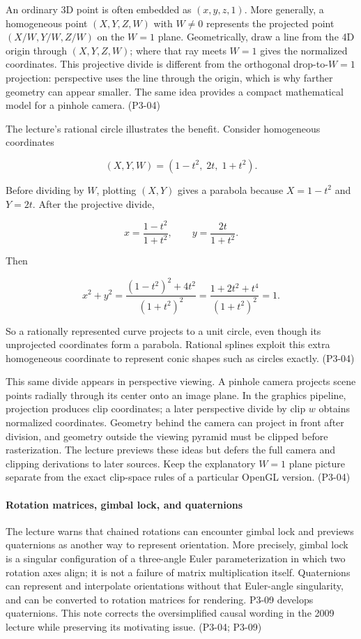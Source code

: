 An ordinary 3D point is often embedded as \((x,y,z,1)\). More generally, a homogeneous point \((X,Y,Z,W)\) with \(W\ne0\) represents the projected point \((X/W,Y/W,Z/W)\) on the \(W=1\) plane. Geometrically, draw a line from the 4D origin through \((X,Y,Z,W)\); where that ray meets \(W=1\) gives the normalized coordinates. This projective divide is different from the orthogonal drop-to-\(W=1\) projection: perspective uses the line through the origin, which is why farther geometry can appear smaller. The same idea provides a compact mathematical model for a pinhole camera. (P3-04)

The lecture's rational circle illustrates the benefit. Consider homogeneous coordinates

\[
(X,Y,W)=(1-t^2,\;2t,\;1+t^2).
\]

Before dividing by \(W\), plotting \((X,Y)\) gives a parabola because \(X=1-t^2\) and \(Y=2t\). After the projective divide,

\[
x=\frac{1-t^2}{1+t^2},\qquad y=\frac{2t}{1+t^2}.
\]

Then

\[
x^2+y^2=\frac{(1-t^2)^2+4t^2}{(1+t^2)^2}
=\frac{1+2t^2+t^4}{(1+t^2)^2}=1.
\]

So a rationally represented curve projects to a unit circle, even though its unprojected coordinates form a parabola. Rational splines exploit this extra homogeneous coordinate to represent conic shapes such as circles exactly. (P3-04)

This same divide appears in perspective viewing. A pinhole camera projects scene points radially through its center onto an image plane. In the graphics pipeline, projection produces clip coordinates; a later perspective divide by clip \(w\) obtains normalized coordinates. Geometry behind the camera can project in front after division, and geometry outside the viewing pyramid must be clipped before rasterization. The lecture previews these ideas but defers the full camera and clipping derivations to later sources. Keep the explanatory \(W=1\) plane picture separate from the exact clip-space rules of a particular OpenGL version. (P3-04)

\paragraph{Rotation matrices, gimbal lock, and quaternions}\label{rotation-matrices-gimbal-lock-and-quaternions}

The lecture warns that chained rotations can encounter gimbal lock and previews quaternions as another way to represent orientation. More precisely, gimbal lock is a singular configuration of a three-angle Euler parameterization in which two rotation axes align; it is not a failure of matrix multiplication itself. Quaternions can represent and interpolate orientations without that Euler-angle singularity, and can be converted to rotation matrices for rendering. P3-09 develops quaternions. This note corrects the oversimplified causal wording in the 2009 lecture while preserving its motivating issue. (P3-04; P3-09)

